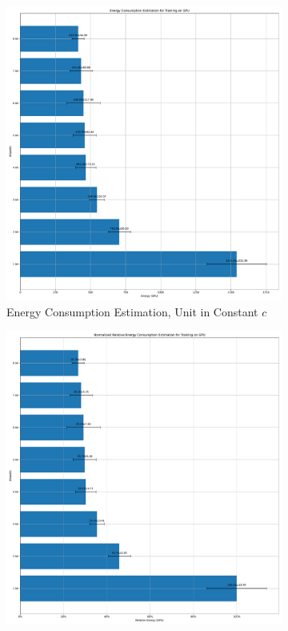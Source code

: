         \begin{figure}[H]
            \centering
            \begin{subfigure}[H]{0.48\textwidth}
                \includegraphics[width=\textwidth]{../standard/NMNIST/plots/nmnist_train_energy_gpu.pdf}
                \caption{Energy Consumption Estimation, Unit in Constant $c$}
            \end{subfigure}
            \hfill
            \begin{subfigure}[H]{0.48\textwidth}
                \includegraphics[width=\textwidth]{../standard/NMNIST/plots/nmnist_train_relative_energy_gpu.pdf}

\end{subfigure}
\end{figure}
